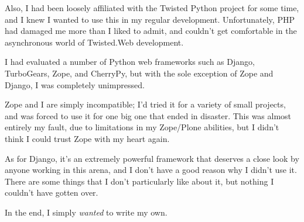 Also, I had been loosely affiliated with the Twisted Python project for some
time, and I knew I wanted to use this in my regular development. Unfortunately,
PHP had damaged me more than I liked to admit, and couldn't get comfortable
in the asynchronous world of Twisted.Web development.

I had evaluated a number of Python web frameworks such as Django, TurboGears,
Zope, and CherryPy, but with the sole exception of Zope and Django, I was
completely unimpressed.

Zope and I are simply incompatible; I'd tried it for a variety of small
projects, and was forced to use it for one big one that ended in disaster. This
was almost entirely my fault, due to limitations in my Zope/Plone abilities,
but I didn't think I could trust Zope with my heart again.

As for Django, it's an extremely powerful framework that deserves a close look
by anyone working in this arena, and I don't have a good reason why I didn't
use it. There are some things that I don't particularly like about it, but
nothing I couldn't have gotten over.

In the end, I simply \emph{wanted} to write my own.

